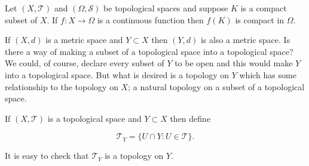 Let $(X, \mathcal{T})$ and $(\Omega, \mathcal{S})$ be topological spaces and suppose $K$ is a compact subset of $X$. If $f: X \to \Omega$ is a continuous function then $f(K)$ is compact in $\Omega$.

If $(X, d)$ is a metric space and $Y \subset X$ then $(Y, d)$ is also a metric space. Is there a way of making a subset of a topological space into a topological space? We could, of course, declare every subset of $Y$ to be open and this would make $Y$ into a topological space. But what is desired is a topology on $Y$ which has some relationship to the topology on $X$; a natural topology on a subset of a topological space.

If $(X, \mathcal{T})$ is a topological space and $Y \subset X$ then define

$$\mathcal{T}_Y = \{U \cap Y: U \in \mathcal{T}\}.$$

It is easy to check that $\mathcal{T}_Y$ is a topology on $Y$.